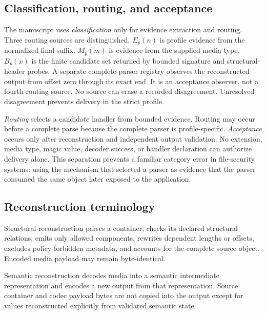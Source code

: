 \subsection{Classification, routing, and acceptance}

The manuscript uses \emph{classification} only for evidence extraction and
routing. Three routing sources are distinguished. $E_p(n)$ is profile evidence
from the normalized final suffix. $M_p(m)$ is evidence from the supplied media
type. $B_p(x)$ is the finite candidate set returned by bounded signature and
structural-header probes. A separate complete-parser registry observes the
reconstructed output from offset zero through its exact end. It is an acceptance
observer, not a fourth routing source. No source can erase a recorded
disagreement. Unresolved disagreement prevents delivery in the strict profile.

\emph{Routing} selects a candidate handler from bounded evidence. Routing may
occur before a complete parse because the complete parser is profile-specific.
\emph{Acceptance} occurs only after reconstruction and independent output
validation. No extension, media type, magic value, decoder success, or handler
declaration can authorize delivery alone. This separation prevents a familiar
category error in file-security systems: using the mechanism that selected a
parser as evidence that the parser consumed the same object later exposed to
the application.

\subsection{Reconstruction terminology}

\begin{definition}
Structural reconstruction parses a container, checks its declared structural
relations, emits only allowed components, rewrites dependent lengths or
offsets, excludes policy-forbidden metadata, and accounts for the complete
source object. Encoded media payload may remain byte-identical.
\end{definition}

\begin{definition}
Semantic reconstruction decodes media into a semantic intermediate
representation and encodes a new output from that representation. Source
container and codec payload bytes are not copied into the output except for
values reconstructed explicitly from validated semantic state.
\end{definition}

